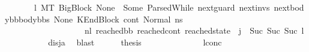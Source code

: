 \begin{isabellebody}
\ \ \ \ \ \ {\isachardoublequoteopen}{\isacharparenleft}{\kern0pt}{\isasymexists}\ l{}{\isachardot}{\kern0pt}\ {\isacharparenleft}{\kern0pt}M{\isacharcomma}{\kern0pt}{\isasymLambda}{\isacharcomma}{\kern0pt}{\isasymGamma}{\isacharcomma}{\kern0pt}{\isasymOmega}{\isacharcomma}{\kern0pt}T\ {\isasymturnstile}{\isacharparenleft}{\kern0pt}{\isacharparenleft}{\kern0pt}BigBlock\ None\ {\isacharbrackleft}{\kern0pt}{\isacharbrackright}{\kern0pt}\ {\isacharparenleft}{\kern0pt}Some\ {\isacharparenleft}{\kern0pt}ParsedWhile\ next{\isacharunderscore}{\kern0pt}guard\ next{\isacharunderscore}{\kern0pt}invs\ {\isacharparenleft}{\kern0pt}next{\isacharunderscore}{\kern0pt}body{\isacharunderscore}{\kern0pt}bb{\isacharhash}{\kern0pt}body{\isacharunderscore}{\kern0pt}bbs{\isacharparenright}{\kern0pt}{\isacharparenright}{\kern0pt}{\isacharparenright}{\kern0pt}\ None{\isacharparenright}{\kern0pt}{\isacharcomma}{\kern0pt}\ KEndBlock\ cont{}{\isacharcomma}{\kern0pt}\ Normal\ ns{}{\isacharprime}{\kern0pt}{\isacharprime}{\kern0pt}{\isacharparenright}{\kern0pt}\ \isanewline
\ \ \ \ \ \ \ \ \ \ \ \ \ \ \ \ \ \ \ {\isacharminus}{\kern0pt}n{\isasymlongrightarrow}{\isacharcircum}{\kern0pt}l{}\ {\isacharparenleft}{\kern0pt}reached{\isacharunderscore}{\kern0pt}bb{\isacharcomma}{\kern0pt}\ reached{\isacharunderscore}{\kern0pt}cont{\isacharcomma}{\kern0pt}\ reached{\isacharunderscore}{\kern0pt}state{\isacharparenright}{\kern0pt}{\isacharparenright}{\kern0pt}\ {\isasymand}\ {\isacharparenleft}{\kern0pt}j{\isacharprime}{\kern0pt}\ {\isacharequal}{\kern0pt}\ Suc\ {\isacharparenleft}{\kern0pt}Suc\ {\isacharparenleft}{\kern0pt}Suc\ l{}{\isacharparenright}{\kern0pt}{\isacharparenright}{\kern0pt}{\isacharparenright}{\kern0pt}\ {\isacharparenright}{\kern0pt}{\isachardoublequoteclose}\ \isanewline
\ \ \ \ \ \ \isamarkupfalse%
\ disj{\isacharunderscore}{\kern0pt}a\ \isamarkupfalse%
\ blast\isanewline
\ \ \ \ \isamarkupfalse%
\ {\isacharquery}{\kern0pt}thesis\isanewline
\ \ \ \ \isamarkupfalse%
\ {\isacharminus}{\kern0pt}\isanewline
\ \ \ \ \ \ \isamarkupfalse%
\ l{}{\isacharunderscore}{\kern0pt}conc\ \ \isanewline

\end{isabellebody}
